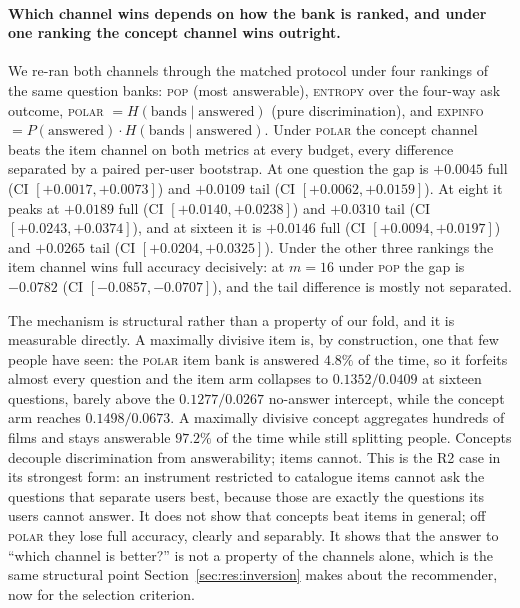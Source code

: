 \documentclass[acmsmall,review,anonymous]{acmart}
\begin{document}
\paragraph{Which channel wins depends on how the bank is ranked, and under one ranking the concept channel wins outright.} We re-ran both channels through the matched protocol under four rankings of the same question banks: \textsc{pop} (most answerable), \textsc{entropy} over the four-way ask outcome, \textsc{polar} $=H(\text{bands}\mid\text{answered})$ (pure discrimination), and \textsc{expinfo} $=P(\text{answered})\cdot H(\text{bands}\mid\text{answered})$. Under \textsc{polar} the concept channel beats the item channel on both metrics at every budget, every difference separated by a paired per-user bootstrap. At one question the gap is $+0.0045$ full (CI $[+0.0017,+0.0073]$) and $+0.0109$ tail (CI $[+0.0062,+0.0159]$). At eight it peaks at $+0.0189$ full (CI $[+0.0140,+0.0238]$) and $+0.0310$ tail (CI $[+0.0243,+0.0374]$), and at sixteen it is $+0.0146$ full (CI $[+0.0094,+0.0197]$) and $+0.0265$ tail (CI $[+0.0204,+0.0325]$). Under the other three rankings the item channel wins full accuracy decisively: at $m{=}16$ under \textsc{pop} the gap is $-0.0782$ (CI $[-0.0857,-0.0707]$), and the tail difference is mostly not separated.

The mechanism is structural rather than a property of our fold, and it is measurable directly. A maximally divisive item is, by construction, one that few people have seen: the \textsc{polar} item bank is answered $4.8\%$ of the time, so it forfeits almost every question and the item arm collapses to $0.1352/0.0409$ at sixteen questions, barely above the $0.1277/0.0267$ no-answer intercept, while the concept arm reaches $0.1498/0.0673$. A maximally divisive concept aggregates hundreds of films and stays answerable $97.2\%$ of the time while still splitting people. Concepts decouple discrimination from answerability; items cannot. This is the R2 case in its strongest form: an instrument restricted to catalogue items cannot ask the questions that separate users best, because those are exactly the questions its users cannot answer. It does not show that concepts beat items in general; off \textsc{polar} they lose full accuracy, clearly and separably. It shows that the answer to ``which channel is better?'' is not a property of the channels alone, which is the same structural point Section~\ref{sec:res:inversion} makes about the recommender, now for the selection criterion.
\end{document}
